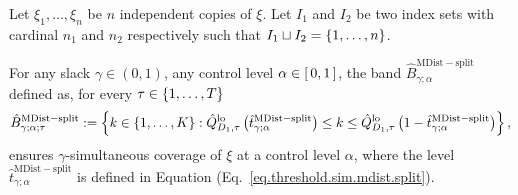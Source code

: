 \documentclass[11pt]{article}
\begin{document}
\begin{corollary}
\label{cor.sim.mdist.split}
Let $\xi_1, \ldots, \xi_n$ be $n$ independent copies of $\xi$.
Let $I_1$ and $I_2$ be two index sets with cardinal $n_1$ and $n_2$ respectively such that
$I_1 \sqcup I_2 = \left\{ 1, \ldots, n \right\}$.


For any slack $\gamma \in (0,1)$, any control level $\alpha \in \left[\, 0, 1 \,\right]$,
the band $\hat{B}^{\mathrm{MDist-split}}_{\gamma; \alpha}$ defined as,
for every $\tau \in \left\{ 1, \ldots, T \right\}$
\begin{align}
    \label{eq.sim.mdist.split}
    \hat{B}_{\gamma; \alpha; \tau}^{\mathrm{MDist-split}} :=
    \left\{ 
        k \in \left\{ 1, \ldots, K \right\} :
        \hat{Q}_{D_1, \tau}^{\mathrm{lo}}
        \left( 
            \hat{t}_{\gamma; \alpha}^{\mathrm{MDist-split}}
         \right)
        \leq k
        \leq \hat{Q}_{D_1, \tau}^{\mathrm{lo}}
        \left( 
            1 - \hat{t}_{\gamma; \alpha}^{\mathrm{MDist-split}}
         \right)
     \right\},
\end{align}
ensures $\gamma$-simultaneous coverage of $\xi$ at a control level $\alpha$,
where the level $\hat{t}_{\gamma; \alpha}^{\mathrm{MDist-split}}$ is defined in Equation (Eq.~\eqref{eq.threshold.sim.mdist.split}).
\end{corollary}
%
%
%
\end{document}
